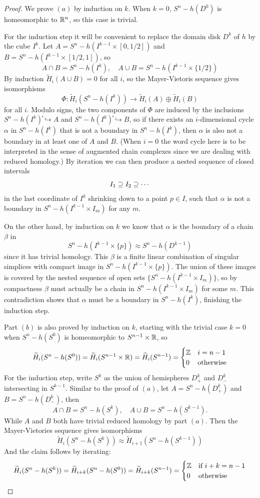 \begin{proof}
We prove $(a)$ by induction on $k$. When $k=0$, $S^n-h(D^0)$ is homeomorphic to $\mathbb{R}^n$, so this case is trivial.\par
For the induction step it will be convenient to replace the domain disk $D^k$ of $h$ by the cube $I^k$. Let $A=S^n-h(I^{k-1}\times[0,1/2])$ and $B=S^n-h(I^{k-1}\times[1/2,1])$, so 
\[A\cap B=S^n-h(I^k),\quad A\cup B=S^n-h(I^{k-1}\times\{1/2\})\]
By induction $\widetilde{H}_i(A\cup B)=0$ for all $i$, so the Mayer-Vietoris sequence gives isomorphisms \[\Phi:\widetilde{H}_i(S^n-h(I^k))\to\widetilde{H}_i(A)\oplus\widetilde{H}_i(B)\]
for all $i$. Modulo signs, the two components of $\Phi$ are induced by the inclusions $S^n-h(I^k)֓\hookrightarrow A$ and $S^n-h(I^k)֓\hookrightarrow B$, so if there exists an $i$-dimensional cycle $\alpha$ in $S^n-h(I^k)$ that is not a boundary in $S^n-h(I^k)$, then $\alpha$ is also not a boundary in at least one of $A$ and $B$. (When $i=0$ the word cycle here is to be interpreted in the sense of augmented chain complexes since we are dealing with reduced homology.) By iteration we can then produce a nested sequence of closed intervals \[I_1\supseteq I_2\supseteq\cdots\]
in the last coordinate of $I^k$ shrinking down to a point $p\in I$, such that $\alpha$ is not a boundary in $S^n-h(I^{k-1}\times I_m)$ for any $m$.\par
On the other hand, by induction on $k$ we know that $\alpha$ is the boundary of a chain $\beta$ in 
\[S^n-h(I^{k-1}\times\{p\})\approx S^n-h(D^{k-1})\]
since it has trivial homology. This $\beta$ is a finite linear combination of singular simplices with compact image in $S^n-h(I^{k-1}\times\{p\})$. The union of these images is covered by the nested sequence of open sets $\{S^n-h(I^{k-1}\times I_m)\}$, so by compactness $\beta$ must actually be a chain in $S^n-h(I^{k-1}\times I_m)$ for some $m$. This contradiction shows that $\alpha$ must be a boundary in $S^n-h(I^k)$, finishing the induction step.\par
Part $(b)$ is also proved by induction on $k$, starting with the trivial case $k=0$ when $S^n-h(S^0)$ is homeomorphic to $S^{n-1}\times\mathbb{R}$, so 
\[\widetilde{H}_i(S^n-h(S^0))=\widetilde{H}_i(S^{n-1}\times\mathbb{R})=\widetilde{H}_i(S^{n-1})=\begin{cases}
\mathbb{Z}&i=n-1\\
0&\text{otherwise}
\end{cases}\]
For the induction step, write $S^k$ as the union of hemispheres $D^k_+$ and $D^k_−$ intersecting in $S^{k-1}$. Similar to the proof of $(a)$, let $A=S^{n}-h(D^k_+)$ and $B=S^n-h(D^k_-)$, then 
\[A\cap B=S^n-h(S^k),\quad A\cup B=S^n-h(S^{k-1}).\]
While $A$ and $B$ both have trivial reduced homology by part $(a)$. Then the Mayer-Vietories sequence gives isomorphisms \[\widetilde{H}_i(S^n-h(S^k))\approx\widetilde{H}_{i+1}(S^n-h(S^{k-1}))\]
And the claim follows by iterating:
\[\widetilde{H}_i(S^n-h(S^k))=\widetilde{H}_{i+k}(S^n-h(S^0))=\widetilde{H}_{i+k}(S^{n-1})=\begin{cases}
\mathbb{Z}&\text{if }i+k=n-1\\
0&\text{otherwise}
\end{cases}\]
\end{proof}
